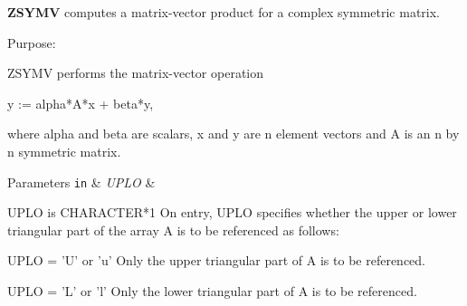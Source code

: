 {\bfseries Z\+S\+Y\+M\+V} computes a matrix-\/vector product for a complex symmetric matrix. 

 \begin{DoxyParagraph}{Purpose\+: }
\begin{DoxyVerb} ZSYMV  performs the matrix-vector  operation

    y := alpha*A*x + beta*y,

 where alpha and beta are scalars, x and y are n element vectors and
 A is an n by n symmetric matrix.\end{DoxyVerb}
 
\end{DoxyParagraph}

\begin{DoxyParams}[1]{Parameters}
\mbox{\tt in}  & {\em U\+P\+L\+O} & \begin{DoxyVerb}          UPLO is CHARACTER*1
           On entry, UPLO specifies whether the upper or lower
           triangular part of the array A is to be referenced as
           follows:

              UPLO = 'U' or 'u'   Only the upper triangular part of A
                                  is to be referenced.

              UPLO = 'L' or 'l'   Only the lower triangular part of A
                                  is to be referenced.


\end{DoxyVerb}
\end{DoxyParams}
